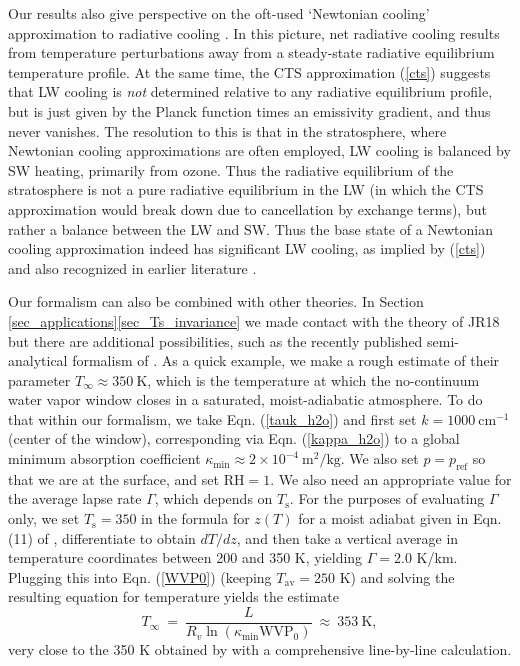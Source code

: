 \documentclass{ametsoc}
\newcommand{\beqn}{\begin{equation}}
\newcommand{\eeqn}{\end{equation}}
\newcommand{\n}{\nonumber}
\newcommand{\eqnref}[1]{(\ref{#1})}
\newcommand{\kg}{\ensuremath{\mathrm{kg}}}
\newcommand{\meter}{\ensuremath{\mathrm{m}}}
\newcommand{\Kelvin}{\ensuremath{\mathrm{K}}}
\newcommand{\cminverse}{\ensuremath{\mathrm{cm^{-1}}}}
\newcommand{\Rv}{\ensuremath{R_v}}
\newcommand{\Ts}{\ensuremath{T_\mathrm{s}}}
\newcommand{\RH}{\ensuremath{\mathrm{RH}}}
\newcommand{\pref}{\ensuremath{p_{\mathrm{ref}}}}
\newcommand{\WVP}{\ensuremath{\mathrm{WVP}}}
\newcommand{\Tav}{\ensuremath{T_{\mathrm{av}}}}
\newcommand{\Tinf}{\ensuremath{T_\infty}}
\newcommand{\kappamin}{\ensuremath{\kappa_{\mathrm{min}}}}
\begin{document}
Our results also give perspective on the oft-used `Newtonian cooling' approximation to radiative cooling \cite[e.g.][]{fueglistaler2009}. In this picture, net radiative cooling results from temperature perturbations away from a steady-state radiative equilibrium  temperature profile. At the same time, the CTS approximation \eqnref{cts}  suggests that LW cooling is \emph{not} determined relative to any radiative equilibrium profile, but is just given by the Planck function  times an emissivity gradient, and thus never vanishes. The resolution to this is that in the stratosphere, where Newtonian cooling approximations are often employed, LW cooling is balanced by SW heating, primarily from ozone. Thus the radiative equilibrium of the stratosphere is not a pure radiative equilibrium in the LW (in which the CTS approximation would break down due to cancellation by exchange terms), but rather a balance between the LW and SW. Thus the base state of a Newtonian cooling approximation indeed has significant LW cooling, as implied by \eqnref{cts} and also recognized in earlier literature \citep[e.g.][]{dickinson1973}.

Our formalism can also be combined with other theories. In Section \ref{sec_applications}\ref{sec_Ts_invariance} we made contact with the theory of JR18 but there are additional possibilities, such as the recently published semi-analytical formalism of \cite{koll2018}. As a quick example, we make a rough estimate of their parameter $\Tinf\approx 350 \ \Kelvin$, which is the temperature at which the no-continuum water vapor window closes in a saturated, moist-adiabatic atmosphere. To do that within our formalism, we take Eqn. \eqnref{tauk_h2o} and first set $k=1000\ \cminverse$ (center of the window), corresponding via Eqn. \eqnref{kappa_h2o} to a global minimum absorption coefficient $\kappamin\approx2\times 10^{-4}\ \meter^2/\kg$. We also set $p=\pref$ so that we are at the surface, and set $\RH=1$. We also need an appropriate value for the average lapse rate $\Gamma$, which depends on \Ts. For the purposes of evaluating $\Gamma$ only, we set $\Ts=350$ in the formula for $z(T)$ for a moist adiabat given in Eqn. (11) of \cite{romps2016cape}, differentiate to obtain $dT/dz$, and then take a vertical average in temperature coordinates between 200 and 350 K, yielding $\Gamma=2.0$ K/km. Plugging this into Eqn. \eqnref{WVP0} (keeping $\Tav=250$ K) and solving the resulting equation for temperature yields the  estimate
\beqn
	\Tinf \ = \ \frac{L}{\Rv \ln(\kappamin\WVP_0)} \ \approx \ 353 \ \Kelvin,
	\n
\eeqn
very close to the 350 K obtained by \cite{koll2018} with a comprehensive line-by-line calculation. 
\end{document}
